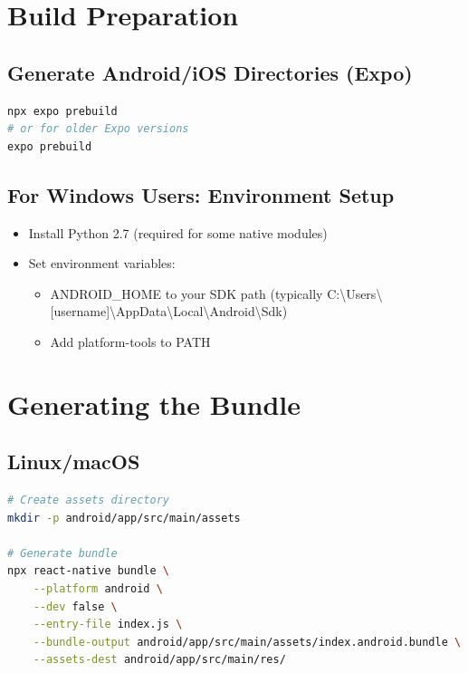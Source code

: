 \documentclass{article}
\begin{document}
\section{Build Preparation}

\subsection{Generate Android/iOS Directories (Expo)}
\begin{lstlisting}[language=bash, caption=Generate native directories]
npx expo prebuild
# or for older Expo versions
expo prebuild
\end{lstlisting}

\subsection{For Windows Users: Environment Setup}
\begin{itemize}
    \item Install Python 2.7 (required for some native modules)
    \item Set environment variables:
    \begin{itemize}
        \item ANDROID\_HOME to your SDK path (typically C:\textbackslash Users\textbackslash [username]\textbackslash AppData\textbackslash Local\textbackslash Android\textbackslash Sdk)
        \item Add platform-tools to PATH
    \end{itemize}
\end{itemize}

\section{Generating the Bundle}

\subsection{Linux/macOS}
\begin{lstlisting}[language=bash, caption=Linux/macOS bundle generation]
# Create assets directory
mkdir -p android/app/src/main/assets

# Generate bundle
npx react-native bundle \
    --platform android \
    --dev false \
    --entry-file index.js \
    --bundle-output android/app/src/main/assets/index.android.bundle \
    --assets-dest android/app/src/main/res/
\end{lstlisting}
\end{document}
